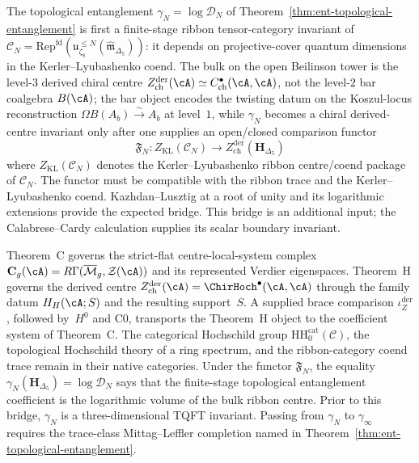 \begin{remark}
\label{rem:ent-topological-entanglement-derived-centre}
The topological entanglement
$\gamma_N=\log\mathcal D_N$ of
Theorem~\ref{thm:ent-topological-entanglement} is first a finite-stage
ribbon tensor-category invariant of
$\mathcal C_N=
\mathrm{Rep}^{\mathrm{fd}}(\mathfrak u_{\zeta_8}^{\le N}
(\widehat{\mathfrak m}_{\Delta_5}))$: it depends on
projective-cover quantum dimensions in the Kerler--Lyubashenko coend.
The bulk on the open Beilinson tower is the level-$3$ derived chiral
centre $Z^{\mathrm{der}}_{\mathrm{ch}}(\cA)\simeq
C^\bullet_{\mathrm{ch}}(\cA,\cA)$, not the level-$2$ bar coalgebra
$B(\cA)$; the bar object encodes the twisting datum on the
Koszul-locus reconstruction
$\Omega B(A_b)\xrightarrow{\sim} A_b$ at level~$1$, while
$\gamma_N$ becomes a chiral derived-centre invariant only after one
supplies an open/closed comparison functor
\[
 \mathfrak F_N\colon Z_{\mathrm{KL}}(\mathcal C_N)
 \longrightarrow
 Z^{\mathrm{der}}_{\mathrm{ch}}(\mathbf H_{\Delta_5})
\]
where $Z_{\mathrm{KL}}(\mathcal C_N)$ denotes the
Kerler--Lyubashenko ribbon centre/coend package of $\mathcal C_N$.
The functor must be compatible with the ribbon trace and the
Kerler--Lyubashenko coend.
Kazhdan--Lusztig at a root of unity and its logarithmic extensions
provide the expected bridge. This bridge is an additional input; the
Calabrese--Cardy calculation supplies its scalar boundary invariant.

Theorem~C governs the strict-flat centre-local-system complex
$\mathbf C_g(\cA)=R\Gamma(\overline{\mathcal M}_g,\mathcal Z(\cA))$
and its represented Verdier eigenspaces.  Theorem~H governs the
derived centre $Z^{\mathrm{der}}_{\mathrm{ch}}(\cA)
=\ChirHoch^\bullet(\cA,\cA)$ through the family datum $H_H(\cA;S)$
and the resulting support~$S$.  A supplied brace comparison
$\iota_Z^{\mathrm{der}}$, followed by~$H^0$ and C0, transports the
Theorem~H object to the coefficient system of Theorem~C.  The
categorical Hochschild group
$\mathrm{HH}^{\mathrm{cat}}_0(\mathcal C)$, the topological
Hochschild theory of a ring spectrum, and the ribbon-category
coend trace remain in their native categories.  Under the functor
$\mathfrak F_N$, the equality
$\gamma_N(\mathbf H_{\Delta_5})=\log\mathcal D_N$ says that the
finite-stage topological entanglement coefficient is the logarithmic
volume of the bulk ribbon centre. Prior to this bridge,
$\gamma_N$ is a three-dimensional TQFT invariant. Passing from $\gamma_N$ to
$\gamma_\infty$ requires the trace-class Mittag--Leffler completion
named in Theorem~\ref{thm:ent-topological-entanglement}.
\end{remark}


